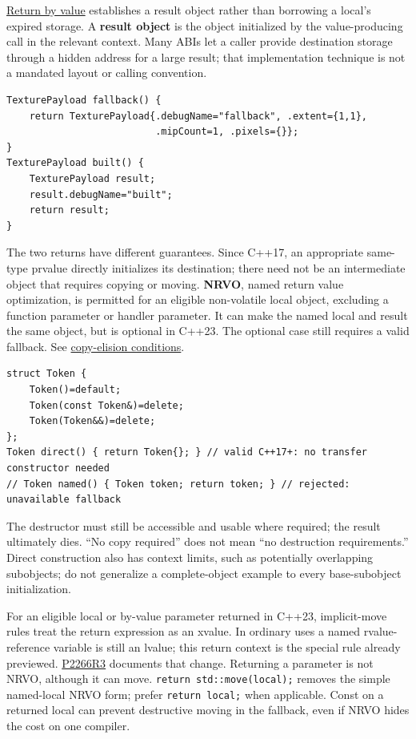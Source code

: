 \hypertarget{01-foundations-i-ch003-return-a-result-without-handing-out-a-lifetime-problem}{}

\hyperref[appendix-b08d3788c5c6]{Return by value} establishes a result object rather than borrowing a local's expired storage. A \textbf{result object} is the object initialized by the value-producing call in the relevant context. Many ABIs let a caller provide destination storage through a hidden address for a large result; that implementation technique is not a mandated layout or calling convention.

\begin{verbatim}
TexturePayload fallback() {
    return TexturePayload{.debugName="fallback", .extent={1,1},
                          .mipCount=1, .pixels={}};
}
TexturePayload built() {
    TexturePayload result;
    result.debugName="built";
    return result;
}
\end{verbatim}

The two returns have different guarantees. Since C++17, an appropriate same-type prvalue directly initializes its destination; there need not be an intermediate object that requires copying or moving. \textbf{NRVO}, named return value optimization, is permitted for an eligible non-volatile local object, excluding a function parameter or handler parameter. It can make the named local and result the same object, but is optional in C++23. The optional case still requires a valid fallback. See \href{https://eel.is/c++draft/class.copy.elision}{copy-elision conditions}.

\begin{verbatim}
struct Token {
    Token()=default;
    Token(const Token&)=delete;
    Token(Token&&)=delete;
};
Token direct() { return Token{}; } // valid C++17+: no transfer constructor needed
// Token named() { Token token; return token; } // rejected: unavailable fallback
\end{verbatim}

The destructor must still be accessible and usable where required; the result ultimately dies. ``No copy required'' does not mean ``no destruction requirements.'' Direct construction also has context limits, such as potentially overlapping subobjects; do not generalize a complete-object example to every base-subobject initialization.

For an eligible local or by-value parameter returned in C++23, implicit-move rules treat the return expression as an xvalue. In ordinary uses a named rvalue-reference variable is still an lvalue; this return context is the special rule already previewed. \href{https://www.open-std.org/jtc1/sc22/wg21/docs/papers/2022/p2266r3.html}{P2266R3} documents that change. Returning a parameter is not NRVO, although it can move. \texttt{return\ std::move(local);} removes the simple named-local NRVO form; prefer \texttt{return\ local;} when applicable. Const on a returned local can prevent destructive moving in the fallback, even if NRVO hides the cost on one compiler.

